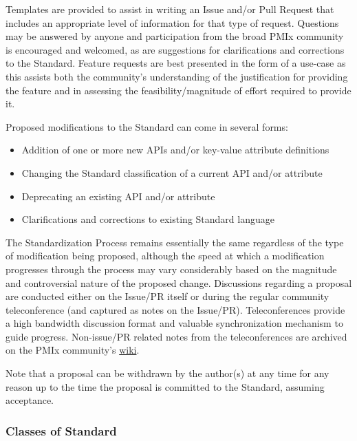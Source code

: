 \documentclass{article}
\begin{document}
Templates are provided to assist in writing an Issue and/or Pull Request
that includes an appropriate level of information for that type of
request. Questions may be answered by anyone and participation from the
broad PMIx community is encouraged and welcomed, as are suggestions for
clarifications and corrections to the Standard. Feature requests are
best presented in the form of a use-case as this assists both the
community's understanding of the justification for providing the feature
and in assessing the feasibility/magnitude of effort required to provide
it.

Proposed modifications to the Standard can come in several forms:

\begin{itemize}
\item
  Addition of one or more new APIs and/or key-value attribute
  definitions
\item
  Changing the Standard classification of a current API and/or attribute
\item
  Deprecating an existing API and/or attribute
\item
  Clarifications and corrections to existing Standard language
\end{itemize}

The Standardization Process remains essentially the same regardless of
the type of modification being proposed, although the speed at which a
modification progresses through the process may vary considerably based
on the magnitude and controversial nature of the proposed change.
Discussions regarding a proposal are conducted either on the Issue/PR
itself or during the regular community teleconference (and captured as
notes on the Issue/PR). Teleconferences provide a high bandwidth
discussion format and valuable synchronization mechanism to guide
progress. Non-issue/PR related notes from the teleconferences are
archived on the PMIx community's
\href{https://github.com/pmix/pmix-standard/wiki\#meeting-information}{wiki}.

Note that a proposal can be withdrawn by the author(s) at any time for
any reason up to the time the proposal is committed to the Standard,
assuming acceptance.

\hypertarget{classes-of-standard}{%
\subsubsection{Classes of Standard}%
\label{classes-of-standard}}
\end{document}
